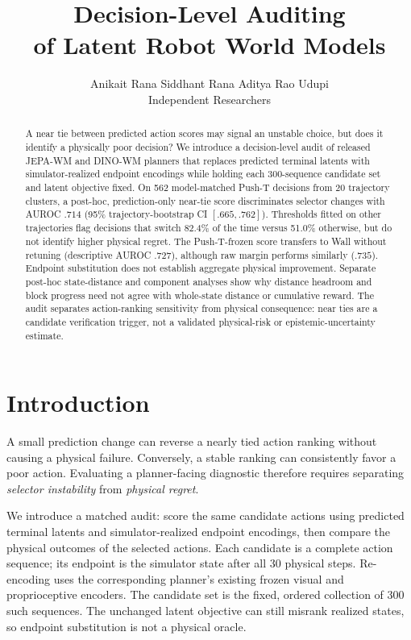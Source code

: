 \documentclass{article}
\title{Decision-Level Auditing\\of Latent Robot World Models}
\author{Anikait Rana \qquad Siddhant Rana \qquad Aditya Rao Udupi\\
Independent Researchers}
\begin{document}
\maketitle

\begin{abstract}
A near tie between predicted action scores may signal an unstable choice, but
does it identify a physically poor decision? We introduce a decision-level
audit of released JEPA-WM and DINO-WM planners that replaces predicted terminal
latents with simulator-realized endpoint encodings while holding each
300-sequence candidate set and latent objective fixed. On 562 model-matched Push-T
decisions from 20 trajectory clusters, a post-hoc, prediction-only near-tie
score discriminates selector changes with AUROC $.714$ (95\%
trajectory-bootstrap CI $[.665,.762]$). Thresholds fitted on other trajectories
flag decisions that switch 82.4\% of the time versus 51.0\% otherwise, but do
not identify higher physical regret. The Push-T-frozen score transfers to Wall
without retuning (descriptive AUROC $.727$), although raw margin performs
similarly ($.735$). Endpoint substitution does not establish aggregate
physical improvement. Separate post-hoc state-distance and component analyses
show why distance headroom and block progress need not agree with whole-state
distance or cumulative reward. The audit separates action-ranking
sensitivity from physical consequence: near ties are a candidate verification
trigger, not a validated physical-risk or epistemic-uncertainty estimate.
\end{abstract}


\section{Introduction}

A small prediction change can reverse a nearly tied action ranking without
causing a physical failure. Conversely, a stable ranking can consistently
favor a poor action. Evaluating a planner-facing diagnostic therefore requires
separating \emph{selector instability} from \emph{physical regret}.

We introduce a matched audit: score the same candidate actions using predicted
terminal latents and simulator-realized endpoint encodings, then compare the
physical outcomes of the selected actions. Each candidate is a complete action
sequence; its endpoint is the simulator state after all 30 physical steps.
Re-encoding uses the corresponding planner's existing frozen visual and
proprioceptive encoders. The candidate set is the fixed, ordered collection of 300 such sequences.
The unchanged latent objective can
still misrank realized states, so endpoint substitution is not a physical oracle.
\end{document}
